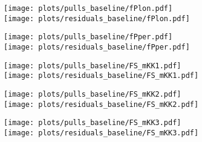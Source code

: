 \begin{subappendices}
\begin{figure}[H] 
  \centering
  \begin{multicols}{2}
  \texttt{[image: plots/pulls\_baseline/fPlon.pdf]}  \\
  \texttt{[image: plots/residuals\_baseline/fPlon.pdf]}
  \end{multicols}  
  \begin{multicols}{2}
  \texttt{[image: plots/pulls\_baseline/fPper.pdf]}  \\
  \texttt{[image: plots/residuals\_baseline/fPper.pdf]}
  \end{multicols}  
  \begin{multicols}{2}
  \texttt{[image: plots/pulls\_baseline/FS\_mKK1.pdf]}  \\
  \texttt{[image: plots/residuals\_baseline/FS\_mKK1.pdf]}
  \end{multicols}  
  \begin{multicols}{2}
  \texttt{[image: plots/pulls\_baseline/FS\_mKK2.pdf]}  \\
  \texttt{[image: plots/residuals\_baseline/FS\_mKK2.pdf]}
  \end{multicols}  
  \begin{multicols}{2}
  \texttt{[image: plots/pulls\_baseline/FS\_mKK3.pdf]}  \\
  \texttt{[image: plots/residuals\_baseline/FS\_mKK3.pdf]}
  \end{multicols}    
\end{figure}


\end{subappendices}
